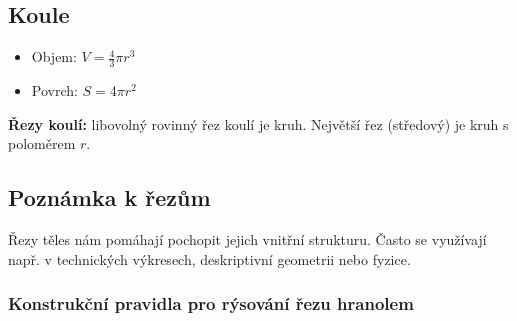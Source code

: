 \subsection{Koule}
\begin{itemize}
    \item Objem: $V = \frac{4}{3} \pi r^3$
    \item Povrch: $S = 4\pi r^2$
\end{itemize}
\textbf{Řezy koulí:} libovolný rovinný řez koulí je kruh. Největší řez (středový) je kruh s poloměrem $r$.

\subsection{Poznámka k řezům}
Řezy těles nám pomáhají pochopit jejich vnitřní strukturu. Často se využívají např. v technických výkresech, deskriptivní geometrii nebo fyzice.

\subsubsection*{Konstrukční pravidla pro rýsování řezu hranolem}


